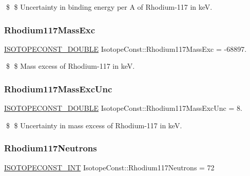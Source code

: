\$ \$ Uncertainty in binding energy per A of Rhodium-\/117 in keV. \mbox{\label{group___isotope_const-_rhodium-_rh117_ga968abc23a44d5bb9ea31270336924f0c}} 
\subsubsection{\texorpdfstring{Rhodium117\+Mass\+Exc}{Rhodium117MassExc}}
{\footnotesize\ttfamily \mbox{\hyperlink{group___isotope_const-_macros_ga8f45a7272ce02c0b4c65c44636ed719a}{I\+S\+O\+T\+O\+P\+E\+C\+O\+N\+S\+T\+\_\+\+D\+O\+U\+B\+LE}} Isotope\+Const\+::\+Rhodium117\+Mass\+Exc = -\/68897.}

\$ \$ Mass excess of Rhodium-\/117 in keV. \mbox{\label{group___isotope_const-_rhodium-_rh117_ga135e8dccd85326a77e9ebb769160566c}} 
\subsubsection{\texorpdfstring{Rhodium117\+Mass\+Exc\+Unc}{Rhodium117MassExcUnc}}
{\footnotesize\ttfamily \mbox{\hyperlink{group___isotope_const-_macros_ga8f45a7272ce02c0b4c65c44636ed719a}{I\+S\+O\+T\+O\+P\+E\+C\+O\+N\+S\+T\+\_\+\+D\+O\+U\+B\+LE}} Isotope\+Const\+::\+Rhodium117\+Mass\+Exc\+Unc = 8.}

\$ \$ Uncertainty in mass excess of Rhodium-\/117 in keV. \mbox{\label{group___isotope_const-_rhodium-_rh117_gab08f919edd2b04a4e23d53d07b96f059}} 
\subsubsection{\texorpdfstring{Rhodium117\+Neutrons}{Rhodium117Neutrons}}
{\footnotesize\ttfamily \mbox{\hyperlink{group___isotope_const-_macros_ga5f18360b3e99483a35c32d789e62621c}{I\+S\+O\+T\+O\+P\+E\+C\+O\+N\+S\+T\+\_\+\+I\+NT}} Isotope\+Const\+::\+Rhodium117\+Neutrons = 72}

